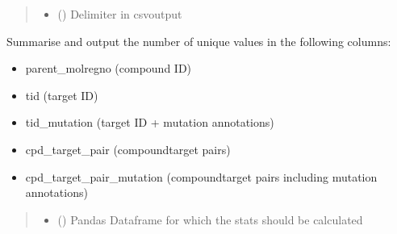 \documentclass[letterpaper,10pt,english]{sphinxmanual}
\begin{document}
\begin{fulllineitems}
\begin{quote}
\begin{description}
\begin{itemize}
\item {} 
\sphinxAtStartPar
{} () \textendash{} Delimiter in csv\sphinxhyphen{}output

\end{itemize}

\end{description}\end{quote}

\end{fulllineitems}


\begin{fulllineitems}
\label{\detokenize{write_subsets:write_subsets.output_stats}}
\pysigstartsignatures
{}
\pysigstopsignatures
\sphinxAtStartPar
Summarise and output the number of unique values in the following columns:
\begin{itemize}
\item {} 
\sphinxAtStartPar
parent\_molregno (compound ID)

\item {} 
\sphinxAtStartPar
tid (target ID)

\item {} 
\sphinxAtStartPar
tid\_mutation (target ID + mutation annotations)

\item {} 
\sphinxAtStartPar
cpd\_target\_pair (compound\sphinxhyphen{}target pairs)

\item {} 
\sphinxAtStartPar
cpd\_target\_pair\_mutation (compound\sphinxhyphen{}target pairs including mutation annotations)

\end{itemize}
\begin{quote}\begin{description}
\begin{itemize}
\item {} 
\sphinxAtStartPar
{} () \textendash{} Pandas Dataframe for which the stats should be calculated


\end{itemize}
\end{description}
\end{quote}
\end{fulllineitems}
\end{document}
